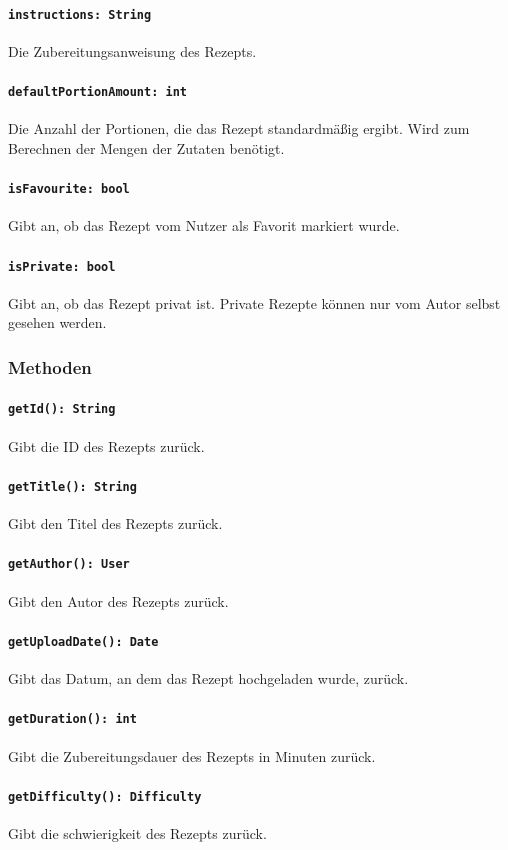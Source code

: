 \documentclass{entwurfsheft}
\begin{document}
\begin{sloppypar}
\paragraph{\texttt{instructions: String}}
Die Zubereitungsanweisung des Rezepts.
\paragraph{\texttt{defaultPortionAmount: int}}
Die Anzahl der Portionen, die das Rezept standardmäßig ergibt. Wird zum Berechnen der Mengen der Zutaten benötigt.
\paragraph{\texttt{isFavourite: bool}}
Gibt an, ob das Rezept vom Nutzer als Favorit markiert wurde.
\paragraph{\texttt{isPrivate: bool}}
Gibt an, ob das Rezept privat ist. Private Rezepte können nur vom Autor selbst gesehen werden.

\subsubsection*{Methoden}
\paragraph{\texttt{getId(): String}}
Gibt die ID des Rezepts zurück.
\paragraph{\texttt{getTitle(): String}}
Gibt den Titel des Rezepts zurück.
\paragraph{\texttt{getAuthor(): User}}
Gibt den Autor des Rezepts zurück.
\paragraph{\texttt{getUploadDate(): Date}}
Gibt das Datum, an dem das Rezept hochgeladen wurde, zurück.
\paragraph{\texttt{getDuration(): int}}
Gibt die Zubereitungsdauer des Rezepts in Minuten zurück.
\paragraph{\texttt{getDifficulty(): Difficulty}}
Gibt die \Gls{schwierigkeit} des Rezepts zurück.

\end{sloppypar}
\end{document}
